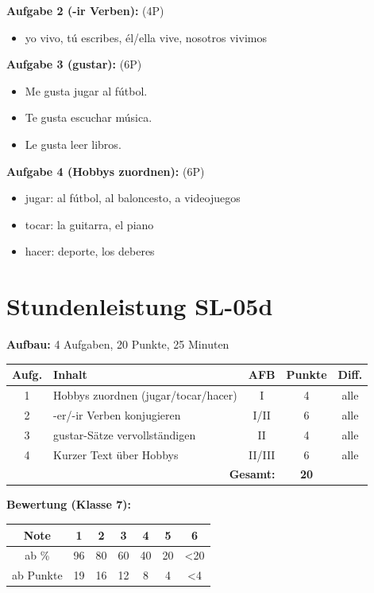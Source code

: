 \documentclass[11pt,a4paper]{article}
\begin{document}
\textbf{Aufgabe 2 (-ir Verben):} (4P)
\begin{itemize}
    \item yo vivo, tú escribes, él/ella vive, nosotros vivimos
\end{itemize}

\textbf{Aufgabe 3 (gustar):} (6P)
\begin{itemize}
    \item Me gusta jugar al fútbol.
    \item Te gusta escuchar música.
    \item Le gusta leer libros.
\end{itemize}

\textbf{Aufgabe 4 (Hobbys zuordnen):} (6P)
\begin{itemize}
    \item jugar: al fútbol, al baloncesto, a videojuegos
    \item tocar: la guitarra, el piano
    \item hacer: deporte, los deberes
\end{itemize}

\section{Stundenleistung SL-05d}

\textbf{Aufbau:} 4 Aufgaben, 20 Punkte, 25 Minuten

\begin{tabular}{|c|l|c|c|c|}
\hline
\textbf{Aufg.} & \textbf{Inhalt} & \textbf{AFB} & \textbf{Punkte} & \textbf{Diff.} \\
\hline
1 & Hobbys zuordnen (jugar/tocar/hacer) & I & 4 & alle \\
\hline
2 & -er/-ir Verben konjugieren & I/II & 6 & alle \\
\hline
3 & gustar-Sätze vervollständigen & II & 4 & alle \\
\hline
4 & Kurzer Text über Hobbys & II/III & 6 & alle \\
\hline
\multicolumn{3}{|r|}{\textbf{Gesamt:}} & \textbf{20} & \\
\hline
\end{tabular}

\textbf{Bewertung (Klasse 7):}
\begin{tabular}{|c|c|c|c|c|c|c|}
\hline
Note & 1 & 2 & 3 & 4 & 5 & 6 \\
\hline
ab \% & 96 & 80 & 60 & 40 & 20 & <20 \\
\hline
ab Punkte & 19 & 16 & 12 & 8 & 4 & <4 \\
\hline
\end{tabular}
\end{document}

